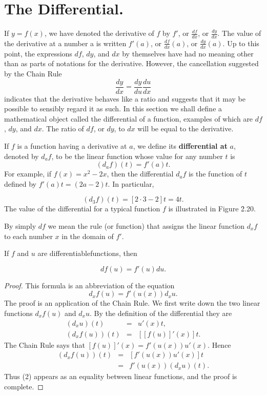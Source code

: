 \section{The Differential.}\label{sec 2.6}
If $y = f(x)$, we have denoted the derivative of $f$ by $f'$, or $\frac{df}{dx}$, or $\frac{dy}{dx}$. The value of the derivative at a number a is written $f'(a)$, or $\frac{df}{dx} (a)$, or $\frac{dy}{dx} (a)$. Up to this point, the expressions $df$, $dy$, and $dx$ by themselves have had no meaning other than as parts of notations for the derivative. However, the cancellation suggested by the Chain Rule
$$
\frac{dy}{dx} = \frac{dy}{du} \frac{du}{dx}
$$
\noindent indicates that the derivative behaves like a ratio and suggests that it may be possible to sensibly regard it as such. In this section we shall define a mathematical object called the differential of a function, examples of which are $df$, $dy$, and $dx$. The ratio of $df$, or $dy$, to $dx$ will be equal to the derivative.


If $f$ is a function having a derivative at $a$, we define its \textbf{differential at} $a$, denoted by $d_{a}f$,  to be the linear function whose value for any number $t$ is
$$
(d_{a}f)(t) = f'(a)t.
$$
For example, if $f(x) = x^2 - 2x$, then the differential $d_{a}f$ is the function of $t$ defined by $f'(a)t =  (2a - 2)t$. In particular,

$$
(d_{3}f)(t)= [2 \cdot 3 - 2]t = 4t.
$$
\noindent The value of the differential for a typical function $f$ is illustrated in Figure \f{2.20}.

By simply $df$ we mean the rule (or function) that assigns the linear function $d_{x}f$ to each number $x$ in the domain of $f'$.

\begin{theorem}
If $f$ and $u$ are differentiablefunctions, then 

\begin{equation}
 df(u) = f'(u)du. 
\label{eq2.6.1}
\end{equation}
\end{theorem}
\begin{proof}
This formula is an abbreviation of the equation 
\begin{equation}
d_{x} f(u) = f'(u(x)) d_{x}u.  
\label{eq2.6.2}
\end{equation}
The proof is an application of the Chain Rule.
We first write down the two linear functions $d_{x}f(u)$ and $d_{x}u$. By the definition of the differential they are
\begin{eqnarray*}
   (d_{x}u)(t) &=& u'(x)t,\\
(d_{x}f(u))(t) &=& [[f(u)]'(x)]t.
\end{eqnarray*}
The Chain Rule says that $[f(u)]'(x) = f'(u(x))u'(x)$. Hence
\begin{eqnarray*}
(d_{x} f(u) )(t) &=& [f'(u(x) )u'(x)]t  \\
                        &=& f'(u(x))(d_{x}u)(t).
\end{eqnarray*}
Thus (2) appears as an equality between linear functions,
and the proof is complete.
\end{proof}

